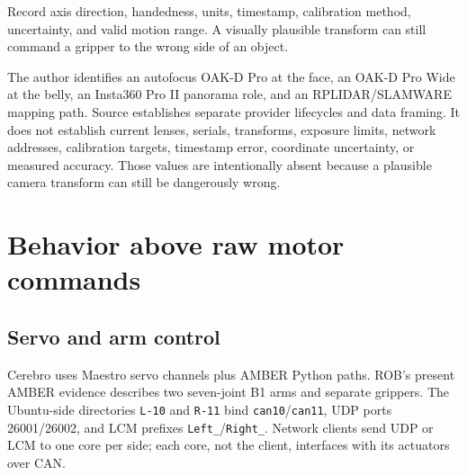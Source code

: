 \documentclass[10pt,openany]{book}
\begin{document}
Record axis direction, handedness, units, timestamp, calibration method, uncertainty, and valid motion range. A visually plausible transform can still command a gripper to the wrong side of an object.


\begin{fieldnotebox}[title={PERCEPTION INVENTORY VERSUS CALIBRATION}]
The author identifies an autofocus OAK-D Pro at the face, an OAK-D Pro Wide at the belly, an Insta360 Pro II panorama role, and an RPLIDAR/SLAMWARE mapping path. Source establishes separate provider lifecycles and data framing. It does not establish current lenses, serials, transforms, exposure limits, network addresses, calibration targets, timestamp error, coordinate uncertainty, or measured accuracy. Those values are intentionally absent because a plausible camera transform can still be dangerously wrong.
\end{fieldnotebox}


\chapter{Behavior above raw motor commands}

\section{Servo and arm control}

Cerebro uses Maestro servo channels plus AMBER Python paths. ROB's present AMBER evidence describes two seven-joint B1 arms and separate grippers. The Ubuntu-side directories \texttt{L-10} and \texttt{R-11} bind \texttt{can10}/\texttt{can11}, UDP ports 26001/26002, and LCM prefixes \texttt{Left\_}/\texttt{Right\_}. Network clients send UDP or LCM to one core per side; each core, not the client, interfaces with its actuators over CAN.
\end{document}

